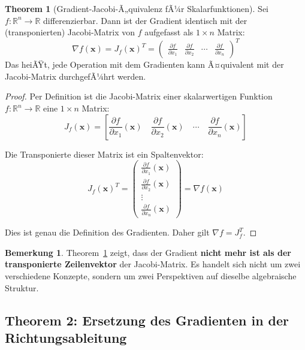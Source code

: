 ﻿\documentclass[a4paper,12pt]{article}
\theoremstyle{definition}
\newtheorem{bemerkung}{Bemerkung}
\newtheorem{theorem}{Theorem}
\begin{document}
\begin{theorem}[Gradient-Jacobi-Ã„quivalenz fÃ¼r Skalarfunktionen]
	\label{thm:gradient_jacobi}
	Sei $f: \mathbb{R}^n \to \mathbb{R}$ differenzierbar. Dann ist der Gradient identisch mit der (transponierten) Jacobi-Matrix von $f$ aufgefasst als $1 \times n$ Matrix:
	\[
	\nabla f(\boldsymbol{x}) = J_f(\boldsymbol{x})^T = \begin{pmatrix}
		\frac{\partial f}{\partial x_1} & \frac{\partial f}{\partial x_2} & \cdots & \frac{\partial f}{\partial x_n}
	\end{pmatrix}^T
	\]
	Das heiÃŸt, jede Operation mit dem Gradienten kann Ã¤quivalent mit der Jacobi-Matrix durchgefÃ¼hrt werden.
\end{theorem}

\begin{proof}
	Per Definition ist die Jacobi-Matrix einer skalarwertigen Funktion $f: \mathbb{R}^n \to \mathbb{R}$ eine $1 \times n$ Matrix:
	\[
	J_f(\boldsymbol{x}) = \left[ \frac{\partial f}{\partial x_1}(\boldsymbol{x}) \quad \frac{\partial f}{\partial x_2}(\boldsymbol{x}) \quad \cdots \quad \frac{\partial f}{\partial x_n}(\boldsymbol{x}) \right]
	\]
	
	Die Transponierte dieser Matrix ist ein Spaltenvektor:
	\[
	J_f(\boldsymbol{x})^T = \begin{pmatrix}
		\frac{\partial f}{\partial x_1}(\boldsymbol{x}) \\
		\frac{\partial f}{\partial x_2}(\boldsymbol{x}) \\
		\vdots \\
		\frac{\partial f}{\partial x_n}(\boldsymbol{x})
	\end{pmatrix} = \nabla f(\boldsymbol{x})
	\]
	
	Dies ist genau die Definition des Gradienten. Daher gilt $\nabla f = J_f^T$.
\end{proof}

\begin{bemerkung}
	Theorem~\ref{thm:gradient_jacobi} zeigt, dass der Gradient \textbf{nicht mehr ist als der transponierte Zeilenvektor} der Jacobi-Matrix. Es handelt sich nicht um zwei verschiedene Konzepte, sondern um zwei Perspektiven auf dieselbe algebraische Struktur.
\end{bemerkung}

\subsection{Theorem 2: Ersetzung des Gradienten in der Richtungsableitung}
\end{document}
